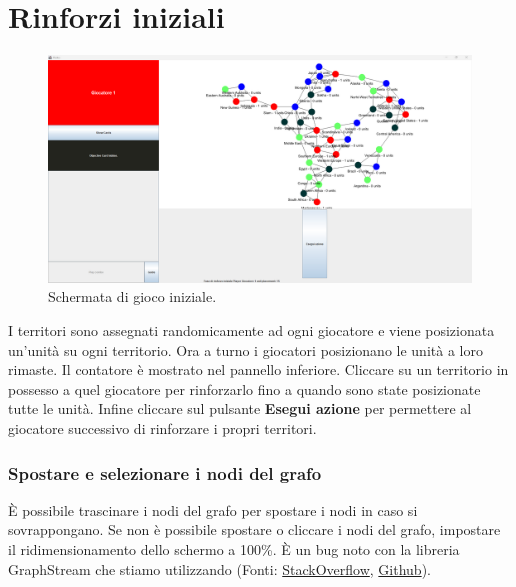 \documentclass[a4paper,12pt]{report}
\begin{document}
\section{Rinforzi iniziali}
\begin{figure}[H]
	\centering
	\includegraphics[width=1\textwidth]{user_guide/4_initial_reinforcements.png}
	\caption{Schermata di gioco iniziale.}
\end{figure}
I territori sono assegnati randomicamente ad ogni giocatore e viene posizionata un'unità su ogni territorio.
Ora a turno i giocatori posizionano le unità a loro rimaste. Il contatore è mostrato nel pannello inferiore. Cliccare su un territorio in possesso a quel giocatore per rinforzarlo fino a quando sono state posizionate tutte le unità. Infine cliccare sul pulsante \textbf{Esegui azione} per permettere al giocatore successivo di rinforzare i propri territori.

\subsubsection{Spostare e selezionare i nodi del grafo}
È possibile trascinare i nodi del grafo per spostare i nodi in caso si sovrappongano.
Se non è possibile spostare o cliccare i nodi del grafo, impostare il ridimensionamento dello schermo a 100\%. È un bug noto con la libreria GraphStream che stiamo utilizzando (Fonti: \href{https://stackoverflow.com/questions/74860061/graphstream-2-0-mouse-pointer-offset-when-dragging-nodes-not-solved}{StackOverflow}, \href{https://github.com/graphstream/gs-core/issues/301}{Github}).
\end{document}
